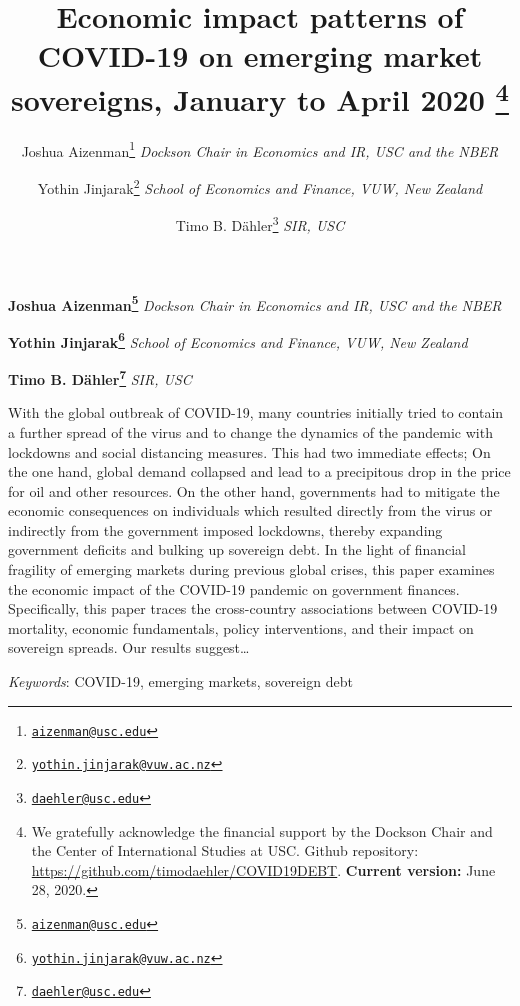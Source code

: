 \documentclass[11pt,]{article}
\title{Economic impact patterns of COVID-19 on emerging market sovereigns,
January to April 2020 \thanks{We gratefully acknowledge the financial support by the Dockson Chair and
the Center of International Studies at USC. Github repository:
\url{https://github.com/timodaehler/COVID19DEBT}. \textbf{Current
version:} June 28, 2020.}  }
\author{\Large Joshua Aizenman\footnote{\href{mailto:aizenman@usc.edu}{\nolinkurl{aizenman@usc.edu}}}\vspace{0.05in} \newline\normalsize\emph{Dockson Chair in Economics and IR, USC and the NBER}   \and \Large Yothin Jinjarak\footnote{\href{mailto:yothin.jinjarak@vuw.ac.nz}{\nolinkurl{yothin.jinjarak@vuw.ac.nz}}}\vspace{0.05in} \newline\normalsize\emph{School of Economics and Finance, VUW, New Zealand}   \and \Large Timo B. Dähler\footnote{\href{mailto:daehler@usc.edu}{\nolinkurl{daehler@usc.edu}}}\vspace{0.05in} \newline\normalsize\emph{SIR, USC}  }
\date{}
\newcommand*{\authorfont}{\fontfamily{phv}\selectfont}
\renewenvironment{abstract}
 {{%
    \setlength{\leftmargin}{0mm}
    \setlength{\rightmargin}{\leftmargin}%
  }%
  \relax}
 {\endlist}
\begin{document}
	
%

{%
\setlength{\parindent}{0pt}
\thispagestyle{plain}
{\fontsize{18}{20}\selectfont\raggedright 
\maketitle  %

}

{
   \vskip 13.5pt\relax \normalsize\fontsize{11}{12} 
\textbf{\authorfont Joshua Aizenman\footnote{\href{mailto:aizenman@usc.edu}{\nolinkurl{aizenman@usc.edu}}}} \hskip 15pt \emph{\small Dockson Chair in Economics and IR, USC and the NBER}   \par \textbf{\authorfont Yothin Jinjarak\footnote{\href{mailto:yothin.jinjarak@vuw.ac.nz}{\nolinkurl{yothin.jinjarak@vuw.ac.nz}}}} \hskip 15pt \emph{\small School of Economics and Finance, VUW, New Zealand}   \par \textbf{\authorfont Timo B. Dähler\footnote{\href{mailto:daehler@usc.edu}{\nolinkurl{daehler@usc.edu}}}} \hskip 15pt \emph{\small SIR, USC}   

}

}








\begin{abstract}

    \hbox{\vrule height .2pt width 39.14pc}

    \vskip 8.5pt %

\noindent With the global outbreak of COVID-19, many countries initially tried to
contain a further spread of the virus and to change the dynamics of the
pandemic with lockdowns and social distancing measures. This had two
immediate effects; On the one hand, global demand collapsed and lead to
a precipitous drop in the price for oil and other resources. On the
other hand, governments had to mitigate the economic consequences on
individuals which resulted directly from the virus or indirectly from
the government imposed lockdowns, thereby expanding government deficits
and bulking up sovereign debt. In the light of financial fragility of
emerging markets during previous global crises, this paper examines the
economic impact of the COVID-19 pandemic on government finances.
Specifically, this paper traces the cross-country associations between
COVID-19 mortality, economic fundamentals, policy interventions, and
their impact on sovereign spreads. Our results suggest\ldots{}


\vskip 8.5pt \noindent \emph{Keywords}: COVID-19, emerging markets, sovereign debt \par

    \hbox{\vrule height .2pt width 39.14pc}



\end{abstract}
\end{document}
